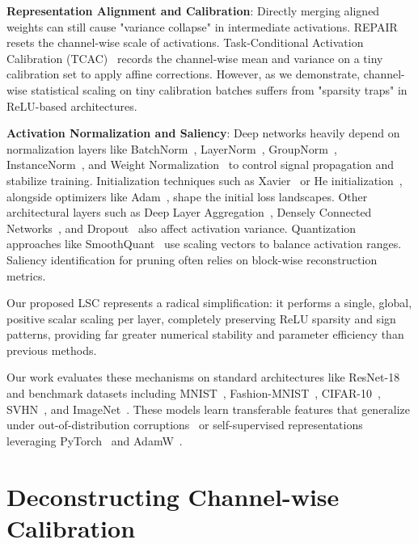 \documentclass{article}
\theoremstyle{plain}
\theoremstyle{definition}
\theoremstyle{remark}
\begin{document}
\textbf{Representation Alignment and Calibration}: Directly merging aligned weights can still cause "variance collapse" in intermediate activations. REPAIR~\cite{jordan2022repair} resets the channel-wise scale of activations. Task-Conditional Activation Calibration (TCAC)~\cite{submission5} records the channel-wise mean and variance on a tiny calibration set to apply affine corrections. However, as we demonstrate, channel-wise statistical scaling on tiny calibration batches suffers from "sparsity traps" in ReLU-based architectures.

\textbf{Activation Normalization and Saliency}: Deep networks heavily depend on normalization layers like BatchNorm~\cite{ioffe2015batch}, LayerNorm~\cite{ba2016layer}, GroupNorm~\cite{wu2018group}, InstanceNorm~\cite{ulyanov2016instance}, and Weight Normalization~\cite{salimans2016weight} to control signal propagation and stabilize training. Initialization techniques such as Xavier~\cite{glorot2010understanding} or He initialization~\cite{he2015delving}, alongside optimizers like Adam~\cite{kingma2014adam}, shape the initial loss landscapes. Other architectural layers such as Deep Layer Aggregation~\cite{yu2018deep}, Densely Connected Networks~\cite{huang2017densely}, and Dropout~\cite{srivastava2014dropout} also affect activation variance. Quantization approaches like SmoothQuant~\cite{xiao2023smoothquant} use scaling vectors to balance activation ranges. Saliency identification for pruning often relies on block-wise reconstruction metrics.

Our proposed LSC represents a radical simplification: it performs a single, global, positive scalar scaling per layer, completely preserving ReLU sparsity and sign patterns, providing far greater numerical stability and parameter efficiency than previous methods.

Our work evaluates these mechanisms on standard architectures like ResNet-18~\cite{he2016deep, zagoruyko2016wide} and benchmark datasets including MNIST~\cite{lecun1998gradient}, Fashion-MNIST~\cite{xiao2017fashion}, CIFAR-10~\cite{krizhevsky2009learning}, SVHN~\cite{netzer2011reading}, and ImageNet~\cite{deng2009imagenet}. These models learn transferable features that generalize under out-of-distribution corruptions~\cite{hendrycks2019benchmarking} or self-supervised representations~\cite{caron2021emerging, radford2021learning} leveraging PyTorch~\cite{paszke2019pytorch} and AdamW~\cite{loshchilov2017decoupled}.

\section{Deconstructing Channel-wise Calibration}
\label{sec:deconstruct}
\end{document}
